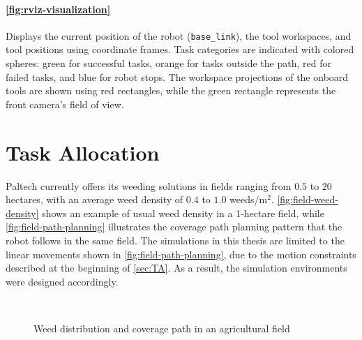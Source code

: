 \paragraph{\autoref{fig:rviz-visualization}} Displays the current position of the robot (\texttt{base\_link}), the tool workspaces, and tool positions using coordinate frames. Task categories are indicated with colored spheres: green for successful tasks, orange for tasks outside the path, red for failed tasks, and blue for robot stops. The workspace projections of the onboard tools are shown using red rectangles, while the green rectangle represents the front camera’s field of view.

\section{Task Allocation}
Paltech currently offers its weeding solutions in fields ranging from $0.5$ to $20$ hectares, with an average weed density of $0.4$ to $1.0$ weeds/m$^2$. \autoref{fig:field-weed-density} shows an example of usual weed density in a 1-hectare field, while \autoref{fig:field-path-planning} illustrates the coverage path planning pattern that the robot follows in the same field. The simulations in this thesis are limited to the linear movements shown in \ref{fig:field-path-planning}, due to the motion constraints described at the beginning of \autoref{sec:TA}. As a result, the simulation environments were designed accordingly.

\begin{figure}[H]
    \myfloatalign
     \quad
     \\
    \caption{Weed distribution and coverage path in an agricultural field}\label{fig:usual-field-example}
\end{figure}

